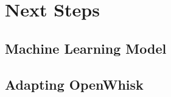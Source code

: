 \documentclass[times, 10pt,twocolumn]{article}
\begin{document}
\section{Next Steps}

\subsection{Machine Learning Model}

\subsection{Adapting OpenWhisk}





\end{document}
